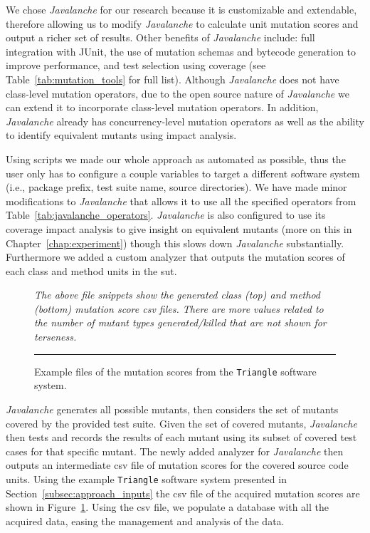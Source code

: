 We chose \emph{Javalanche} for our research because it is customizable and extendable, therefore allowing us to modify \emph{Javalanche} to calculate unit mutation scores and output a richer set of results. Other benefits of \emph{Javalanche} include: full integration with JUnit, the use of mutation schemas and bytecode generation to improve performance, and test selection using coverage (see Table~\ref{tab:mutation_tools} for full list). Although \emph{Javalanche} does not have class-level mutation operators, due to the open source nature of \emph{Javalanche} we can extend it to incorporate class-level mutation operators. In addition, \emph{Javalanche} already has concurrency-level mutation operators as well as the ability to identify equivalent mutants using impact analysis.

Using scripts we made our whole approach as automated as possible, thus the user only has to configure a couple variables to target a different software system (i.e., package prefix, test suite name, source directories). We have made minor modifications to \emph{Javalanche} that allows it to use all the specified operators from Table~\ref{tab:javalanche_operators}. \emph{Javalanche} is also configured to use its coverage impact analysis to give insight on equivalent mutants (more on this in Chapter~\ref{chap:experiment}) though this slows down \emph{Javalanche} substantially. Furthermore we added a custom analyzer that outputs the mutation scores of each class and method units in the \gls{sut}.

\begin{figure}[!tb]
  \centering
  
  
  \caption{Example  files of the mutation scores from the \texttt{Triangle} software system.}
  \vspace{1mm}
  \footnotesize{\emph{The above file snippets show the generated class (top) and method (bottom) mutation score \gls{csv} files. There are more values related to the number of mutant types generated/killed that are not shown for terseness.}}
  \vspace{2mm}
  \hrule
  \label{fig:triangle_mutation_scores}
\end{figure}

\emph{Javalanche} generates all possible mutants, then considers the set of mutants covered by the provided test suite. Given the set of covered mutants, \emph{Javalanche} then tests and records the results of each mutant using its subset of covered test cases for that specific mutant. The newly added analyzer for \emph{Javalanche} then outputs an intermediate \gls{csv} file of mutation scores for the covered source code units. Using the example \texttt{Triangle} software system presented in Section~\ref{subsec:approach_inputs} the \gls{csv} file of the acquired mutation scores are shown in Figure~\ref{fig:triangle_mutation_scores}. Using the \gls{csv} file, we populate a database with all the acquired data, easing the management and analysis of the data.


